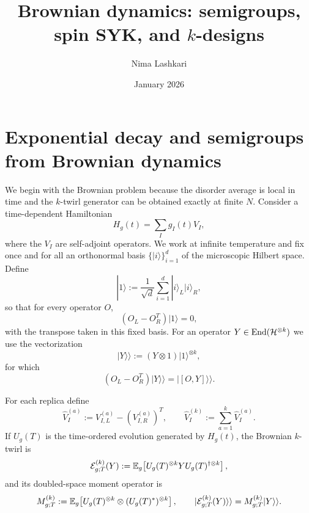 \documentclass{article}
\title{Brownian dynamics: semigroups, spin SYK, and $k$-designs}
\author{Nima Lashkari}
\date{January 2026}
\theoremstyle{definition}
\begin{document}
    \maketitle
    \tableofcontents

\section{Exponential decay and semigroups from Brownian dynamics}
\label{sec:brownian_general}

We begin with the Brownian problem because the disorder average is local in
time and the $k$-twirl generator can be obtained exactly at finite $N$.
Consider a time-dependent Hamiltonian
\begin{equation}
    H_g(t)=\sum_I g_I(t)V_I,
\end{equation}
where the $V_I$ are self-adjoint operators.  We work at infinite temperature
and fix once and for all an orthonormal basis $\{|i\rangle\}_{i=1}^d$ of the
microscopic Hilbert space.  Define
\begin{equation}
    |1\rangle
    :=\frac{1}{\sqrt d}\sum_{i=1}^d|i\rangle_L|i\rangle_R,
\end{equation}
so that for every operator $O$,
\begin{equation}
    (O_L-O_R^T)|1\rangle=0,
\end{equation}
with the transpose taken in this fixed basis.  For an operator
$Y\in{\rm End}({\cal H}^{\otimes k})$ we use the vectorization
\begin{equation}
    |Y\rangle\rangle:=(Y\otimes1)|1\rangle^{\otimes k},
\end{equation}
for which
\begin{equation}
    (O_L-O_R^T)|Y\rangle\rangle
    =|[O,Y]\rangle\rangle.
\end{equation}

For each replica define
\begin{equation}
    \widehat V_I^{(a)}
    :=V_{I,L}^{(a)}-(V_{I,R}^{(a)})^T,
    \qquad
    \widehat V_I^{(k)}
    :=\sum_{a=1}^k\widehat V_I^{(a)}.
\end{equation}
If $U_g(T)$ is the time-ordered evolution generated by $H_g(t)$, the
Brownian $k$-twirl is
\begin{equation}
    {\cal E}_{g;T}^{(k)}(Y)
    :=\mathbb E_g\!\left[
       U_g(T)^{\otimes k}Y U_g(T)^{\dagger\otimes k}
    \right],
\end{equation}
and its doubled-space moment operator is
\begin{equation}
    M_{g;T}^{(k)}
    :=\mathbb E_g\!\left[
       U_g(T)^{\otimes k}\otimes(U_g(T)^*)^{\otimes k}
    \right],
    \qquad
    |{\cal E}_{g;T}^{(k)}(Y)\rangle\rangle
    =M_{g;T}^{(k)}|Y\rangle\rangle.
\end{equation}
\end{document}
